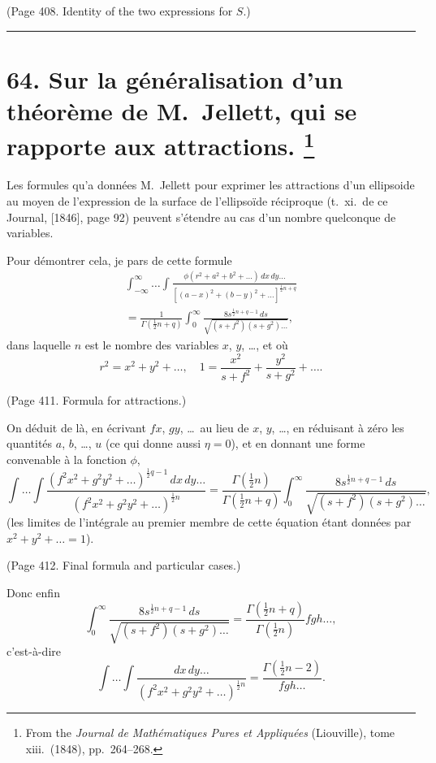 \documentclass[11pt,a4paper]{book}
\begin{document}
(Page 408. Identity of the two expressions for $S$.)

\bigskip
\hrule
\bigskip

\newpage
\section[Sur la g\'{e}n\'{e}ralisation d'un th\'{e}or\`{e}me de M.~Jellett, qui se rapporte aux attractions]{%
64. Sur la g\'{e}n\'{e}ralisation d'un th\'{e}or\`{e}me de M.~Jellett, qui se rapporte aux attractions.%
\footnote{From the \textit{Journal de Math\'{e}matiques Pures et Appliqu\'{e}es} (Liouville), tome xiii.\ (1848), pp.~264--268.}}

Les formules qu'a donn\'{e}es M.~Jellett pour exprimer les attractions d'un ellipsoide
au moyen de l'expression de la surface de l'ellipso\"{i}de r\'{e}ciproque (t.~xi.\ de ce Journal,
[1846], page 92) peuvent s'\'{e}tendre au cas d'un nombre quelconque de variables.

Pour d\'{e}montrer cela, je pars de cette formule
\begin{multline*}
\int_{-\infty}^{\infty} \ldots \int \frac{\phi(r^2 + a^2 + b^2 + \ldots)\,dx\,dy\ldots}
{[(a-x)^2 + (b-y)^2 + \ldots]^{\frac{1}{2}n+q}} \\
= \frac{1}{\Gamma(\tfrac{1}{2}n + q)} \int_0^\infty \frac{8s^{\frac{1}{2}n+q-1}\,ds}{\sqrt{(s+f^2)(s+g^2)\ldots}}, \tag{1}
\end{multline*}
dans laquelle $n$ est le nombre des variables $x$, $y$, \ldots, et o\`{u}
\[
r^2 = x^2 + y^2 + \ldots, \quad 1 = \frac{x^2}{s+f^2} + \frac{y^2}{s+g^2} + \ldots. \tag{2}
\]

(Page 411. Formula for attractions.)

On d\'{e}duit de l\`{a}, en \'{e}crivant $fx$, $gy$, \ldots\ au lieu de $x$, $y$, \ldots, en r\'{e}duisant \`{a} z\'{e}ro les
quantit\'{e}s $a$, $b$, \ldots, $u$ (ce qui donne aussi $\eta = 0$), et en donnant une forme convenable
\`{a} la fonction $\phi$,
\[
\int \ldots \int \frac{(f^2x^2 + g^2y^2 + \ldots)^{\frac{1}{2}q-1}\,dx\,dy\ldots}
{(f^2x^2 + g^2y^2 + \ldots)^{\frac{1}{2}n}}
= \frac{\Gamma(\tfrac{1}{2}n)}{\Gamma(\tfrac{1}{2}n + q)} \int_0^\infty \frac{8s^{\frac{1}{2}n+q-1}\,ds}{\sqrt{(s+f^2)(s+g^2)\ldots}}, \tag{3}
\]
(les limites de l'int\'{e}grale au premier membre de cette \'{e}quation \'{e}tant donn\'{e}es par
$x^2 + y^2 + \ldots = 1$).

(Page 412. Final formula and particular cases.)

Donc enfin
\[
\int_0^\infty \frac{8s^{\frac{1}{2}n+q-1}\,ds}{\sqrt{(s+f^2)(s+g^2)\ldots}}
= \frac{\Gamma(\tfrac{1}{2}n+q)}{\Gamma(\tfrac{1}{2}n)} fgh\ldots, \tag{11}
\]
c'est-\`{a}-dire
\[
\int \ldots \int \frac{dx\,dy\ldots}{(f^2x^2 + g^2y^2 + \ldots)^{\frac{1}{2}n}}
= \frac{\Gamma(\tfrac{1}{2}n-2)}{fgh\ldots}. \tag{12}
\]
\end{document}
